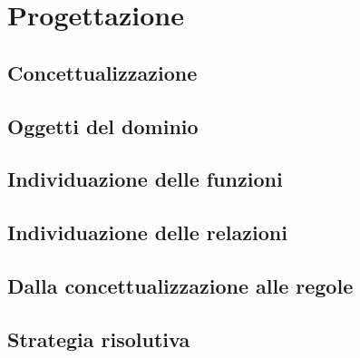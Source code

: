\section{Progettazione}
\subsection{Concettualizzazione}
\subsection{Oggetti del dominio}
\subsection{Individuazione delle funzioni}
\subsection{Individuazione delle relazioni}
\subsection{Dalla concettualizzazione alle regole}
\subsection{Strategia risolutiva}